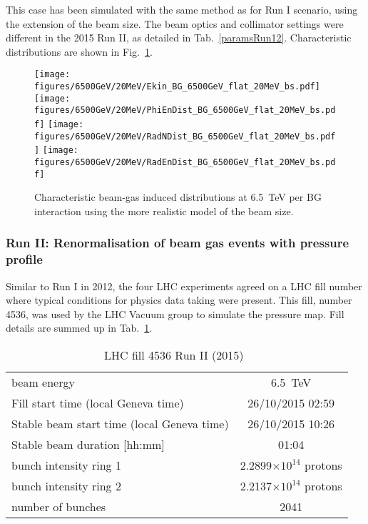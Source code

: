 This case has been simulated with the same method as for Run I scenario, using the extension of the beam size. The beam optics and collimator settings were different in the 2015 Run II, as detailed in Tab.~\ref{paramsRun12}. Characteristic distributions are shown in Fig.~\ref{bg6500}.

\begin{figure}%
\begin{center}
  \texttt{[image: figures/6500GeV/20MeV/Ekin\_BG\_6500GeV\_flat\_20MeV\_bs.pdf]}
  \texttt{[image: figures/6500GeV/20MeV/PhiEnDist\_BG\_6500GeV\_flat\_20MeV\_bs.pdf]}
  \texttt{[image: figures/6500GeV/20MeV/RadNDist\_BG\_6500GeV\_flat\_20MeV\_bs.pdf]}
  \texttt{[image: figures/6500GeV/20MeV/RadEnDist\_BG\_6500GeV\_flat\_20MeV\_bs.pdf]}
\end{center}
\vspace{-0.6cm}
 \caption{Characteristic beam-gas induced distributions at 6.5~TeV per BG interaction using the more realistic model of the beam size.
  \label{bg6500}}
\end{figure}

\subsubsection{Run II: Renormalisation of beam gas events with pressure profile}

Similar to Run I in 2012, the four LHC experiments agreed on a LHC fill number where typical conditions for physics data taking were present. This fill, number 4536, was used by the LHC Vacuum group to simulate the pressure map. Fill details are summed up in Tab.~\ref{tab:fillRunII}. 

\begin{table}
   \centering
   \caption{LHC fill 4536 Run II (2015)~\cite{refAccStats}}
   \begin{tabular}{l||c}
       \hline
       beam energy  & 6.5~TeV \\
       Fill start time (local Geneva time) & 26/10/2015 02:59\\
       Stable beam start time (local Geneva time) & 26/10/2015 10:26\\
       Stable beam duration [hh:mm] & 01:04\\
       bunch intensity ring 1& 2.2899$\times 10^{14}$ protons\\
       bunch intensity ring 2& 2.2137$\times 10^{14}$ protons\\
       number of bunches & 2041 \\
       \hline
   \end{tabular}
   \label{tab:fillRunII}
\end{table}

